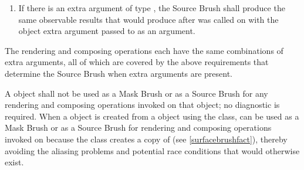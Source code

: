 \begin{itemize}
\begin{enumerate}
		\item If there is an extra argument of type , the Source Brush shall produce the same observable results that  would produce after  was called on  with the  object extra argument passed to  as an argument.
	\end{enumerate}
\end{itemize}

\pnum
\enternote
The rendering and composing operations each have the same combinations of extra arguments, all of which are covered by the above requirements that determine the Source Brush when extra arguments are present.
\exitnote

%
\pnum
A  object shall not be used as a Mask Brush or as a Source Brush for any rendering and composing operations invoked on that  object; no diagnostic is required.
\enternote
When a  object  is created from a  object  using the  class,  can be used as a Mask Brush or as a Source Brush for rendering and composing operations invoked on  because the  class creates a copy of  (see \ref{surfacebrushfact}), thereby avoiding the aliasing problems and potential race conditions that would otherwise exist.
\exitnote

